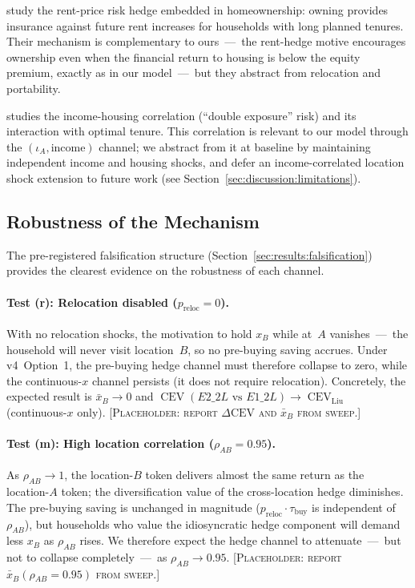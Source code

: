 \citet{SinaiSouleles2005} study the rent-price risk hedge embedded in
homeownership: owning provides insurance against future rent increases for
households with long planned tenures.
Their mechanism is complementary to ours~---~the rent-hedge motive
encourages ownership even when the financial return to housing is below
the equity premium, exactly as in our model~---~but they abstract from
relocation and portability.

\citet{Davidoff2006} studies the income-housing correlation (``double
exposure'' risk) and its interaction with optimal tenure.
This correlation is relevant to our model through the $(\iota_A, \text{income})$
channel; we abstract from it at baseline by maintaining independent income
and housing shocks, and defer an income-correlated location shock extension
to future work (see Section~\ref{sec:discussion:limitations}).

\subsection{Robustness of the Mechanism}
\label{sec:discussion:robustness}

The pre-registered falsification structure (Section~\ref{sec:results:falsification})
provides the clearest evidence on the robustness of each channel.

\paragraph{Test (r): Relocation disabled ($p_{\text{reloc}} = 0$).}
With no relocation shocks, the motivation to hold $x_B$ while at~$A$
vanishes~---~the household will never visit location~$B$, so no
pre-buying saving accrues.
Under v4~Option~1, the pre-buying hedge channel must therefore collapse
to zero, while the continuous-$x$ channel persists (it does not require
relocation).
Concretely, the expected result is $\bar{x}_B \to 0$ and
$\operatorname{CEV}(E2\_2L \text{ vs } E1\_2L) \to
\operatorname{CEV}_{\text{Liu}}$ (continuous-$x$ only).
[\textsc{Placeholder: report $\Delta\text{CEV}$ and $\bar{x}_B$ from sweep.}]

\paragraph{Test (m): High location correlation ($\rho_{AB} = 0.95$).}
As $\rho_{AB} \to 1$, the location-$B$ token delivers almost the same
return as the location-$A$ token; the diversification value of the
cross-location hedge diminishes.
The pre-buying saving is unchanged in magnitude ($p_{\text{reloc}} \cdot
\tau_{\text{buy}}$ is independent of $\rho_{AB}$), but households who
value the idiosyncratic hedge component will demand less $x_B$ as
$\rho_{AB}$ rises.
We therefore expect the hedge channel to attenuate~---~but not to
collapse completely~---~as $\rho_{AB} \to 0.95$.
[\textsc{Placeholder: report $\bar{x}_B(\rho_{AB} = 0.95)$ from sweep.}]

